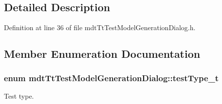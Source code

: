 \subsection{Detailed Description}


Definition at line 36 of file mdt\-Tt\-Test\-Model\-Generation\-Dialog.\-h.



\subsection{Member Enumeration Documentation}
\hypertarget{classmdt_tt_test_model_generation_dialog_a833486450bf0b6414015ab3b8e8432da}{
\subsubsection[{test\-Type\-\_\-t}]{\setlength{\rightskip}{0pt plus 5cm}enum {\bf mdt\-Tt\-Test\-Model\-Generation\-Dialog\-::test\-Type\-\_\-t}}}\label{classmdt_tt_test_model_generation_dialog_a833486450bf0b6414015ab3b8e8432da}


Test type. 

